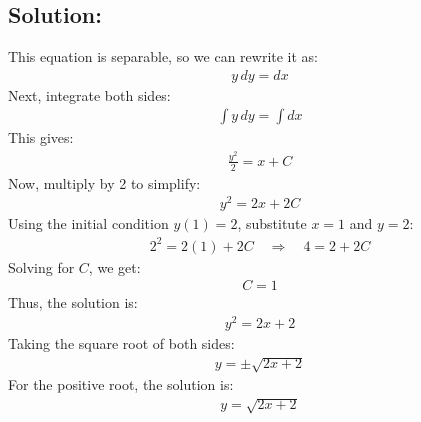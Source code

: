 \documentclass[letterpaper,10pt,english]{jupyterBook}
\begin{document}
\subsection{Solution:}
\label{\detokenize{prerequisites:id7}}
\sphinxAtStartPar
This equation is separable, so we can rewrite it as:
\begin{equation*}
\begin{split}
y \, dy = dx
\end{split}
\end{equation*}
\sphinxAtStartPar
Next, integrate both sides:
\begin{equation*}
\begin{split}
\int y \, dy = \int dx
\end{split}
\end{equation*}
\sphinxAtStartPar
This gives:
\begin{equation*}
\begin{split}
\frac{y^2}{2} = x + C
\end{split}
\end{equation*}
\sphinxAtStartPar
Now, multiply by 2 to simplify:
\begin{equation*}
\begin{split}
y^2 = 2x + 2C
\end{split}
\end{equation*}
\sphinxAtStartPar
Using the initial condition \(y(1) = 2\), substitute \(x = 1\) and \(y = 2\):
\begin{equation*}
\begin{split}
2^2 = 2(1) + 2C \quad \Rightarrow \quad 4 = 2 + 2C
\end{split}
\end{equation*}
\sphinxAtStartPar
Solving for \(C\), we get:
\begin{equation*}
\begin{split}
C = 1
\end{split}
\end{equation*}
\sphinxAtStartPar
Thus, the solution is:
\begin{equation*}
\begin{split}
y^2 = 2x + 2
\end{split}
\end{equation*}
\sphinxAtStartPar
Taking the square root of both sides:
\begin{equation*}
\begin{split}
y = \pm \sqrt{2x + 2}
\end{split}
\end{equation*}
\sphinxAtStartPar
For the positive root, the solution is:
\begin{equation*}
\begin{split}
y = \sqrt{2x + 2}
\end{split}
\end{equation*}
\end{document}
